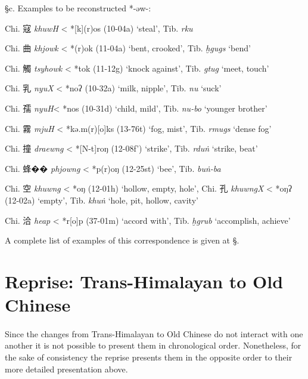 §c. Examples to be reconstructed *-əw-:

\begin{description} \item
Chi. 寇  \emph{khuwH} \textless{} *[k]{}{}(r)os (10-04a) `steal', Tib. {} \emph{rku}
\item
Chi. 曲  \emph{khjowk} \textless{} *{}(r)ok (11-04a) `bent, crooked',
Tib. {} \emph{ḫgugs} `bend'
\item
Chi. 觸  \emph{tsyhowk} \textless{} *t{}ok (11-12g) `knock against', Tib. {} \emph{gtug} `meet, touch'
\item
Chi. 乳  \emph{nyuX} \textless{} *noʔ (10-32a) `milk, nipple', Tib. {} \emph{nu} `suck'
\item
Chi. 孺  \emph{nyuH}\textless{} *nos (10-31d) `child, mild', Tib. {} \emph{nu-bo} `younger brother'
\item
Chi. 霧  \emph{mjuH} \textless{} *kə.m(r){[}o]ks (13-76t) `fog, mist',
Tib. {} \emph{rmugs} `dense fog'
\item
Chi. 撞  \emph{draewng} \textless{} *[N-t]{}roŋ (12-08f') `strike',
Tib. {} \emph{rduṅ} `strike, beat'
\item
Chi. 蜂�� 
\emph{phjowng} \textless{} *p{}(r)oŋ (12-25st) `bee', Tib. {} \emph{buṅ-ba}
\item
Chi. 空  \emph{khuwng} \textless{} *{}{}oŋ (12-01h) `hollow, empty, hole',
Chi. 孔  \emph{khuwngX} \textless{} *{}oŋʔ (12-02a) `empty', Tib. {} \emph{khuṅ} `hole, pit, hollow, cavity'
\item
Chi. 洽  \emph{heap} \textless{} *{}r{[}o]p (37-01m) `accord
with', Tib. {} \emph{ḫgrub} `accomplish, achieve'
\end{description}

A complete list of examples of this correspondence is given at §.

\section{Reprise: Trans-Himalayan to Old
Chinese}\label{reprise-trans-himalayan-to-old-chinese}

\paragraph{}Since the changes from Trans-Himalayan to Old Chinese do not interact
with one another it is not possible to present them in chronological
order. Nonetheless, for the sake of consistency the reprise presents
them in the opposite order to their more detailed presentation above.

